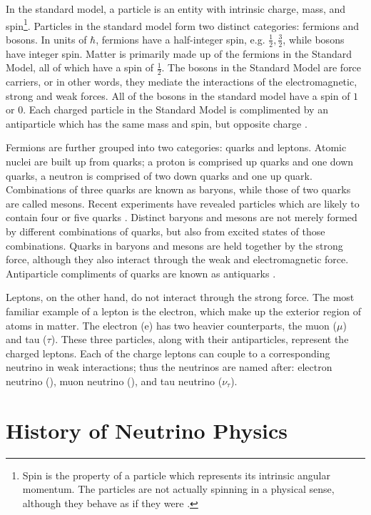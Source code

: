 In the standard model, a particle is an entity with intrinsic charge, mass, and
spin\footnote{Spin is the property of a particle which represents its intrinsic
angular momentum.  The particles are not actually spinning in a physical
sense, although they behave as if they were \cite{halzen1984quarks}.}.
Particles in the standard model form two distinct categories: fermions and
bosons.
In units of $\hbar$, fermions have a half-integer spin, e.g.
$\frac{1}{2}, \frac{3}{2}$, while bosons have integer spin.  Matter is primarily made up of the fermions in the Standard Model, all of which have a
spin of $\frac{1}{2}$.
The bosons in the Standard Model are force carriers, or in other words, they
mediate the interactions of the electromagnetic, strong and weak forces.  All
of the bosons in the standard model have a spin of $1$ or $0$.  Each
charged particle in the Standard Model is complimented by an antiparticle which
has the same mass and spin, but opposite charge \cite{halzen1984quarks}.

Fermions are further grouped into two categories: quarks and leptons.  Atomic
nuclei are built up from quarks; a proton is comprised up quarks and one down
quarks, a neutron is comprised of two down quarks and one up quark.
Combinations of three quarks are known as baryons, while those of two quarks
are called mesons.  Recent experiments have revealed particles which are likely
to contain four or five quarks \cite{dias2013z_,barth2003evidence}.  Distinct
baryons and mesons are not merely formed by different combinations of quarks,
but also from excited states of those combinations.  Quarks in baryons and
mesons are held together by the strong force, although they also interact
through the weak and electromagnetic force.  Antiparticle compliments of quarks
are known as antiquarks   \cite{halzen1984quarks}.

Leptons, on the other hand, do not interact through the strong force.  The most
familiar example of a lepton is the electron, which make up the exterior region
of atoms in matter.  The electron (e) has two heavier counterparts, the muon
($\mu$) and tau ($\tau$).  These three particles, along with their
antiparticles, represent the charged leptons.  Each of the charge leptons can
couple to a corresponding neutrino in weak interactions; thus the neutrinos are
named after: electron neutrino (\nue), muon neutrino (\numu), and tau neutrino
($\nu_\tau$).

\section{History of Neutrino Physics}

